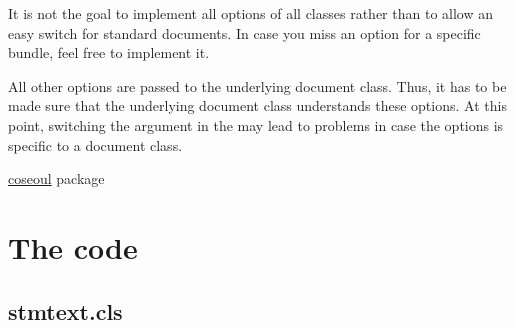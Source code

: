 \documentclass[%
  type=article,%
  layout=koma,%
  page=false,%
  cleveref=true,%
  conditionallox=true,%
  conditionalloxnewpage=true,%
  date=true,%
  glossaries=true,%
  hyperref=true,%
  index=true,%
  listings=true%
]{stmtext}
\begin{document}
It is not the goal to implement all options of all classes rather than to allow an easy switch for standard documents. In case you miss an option for a specific bundle, feel free to implement it.






% 


All other options are passed to the underlying document class. Thus, it has to be made sure that the underlying document class understands these options. At this point, switching the argument in the  may lead to problems in case the options is specific to a document class.

\setcounter{currentlevel}{\basetoclevelnr}
\label{sec:usage}


\href{https://ctan.org/tex-archive/macros/latex/contrib/coseoul}{coseoul} package

\printstmacronyms

\printstmindex

\newpage
\appendix

\section{The code}

\subsection{stmtext.cls}


\end{document}
